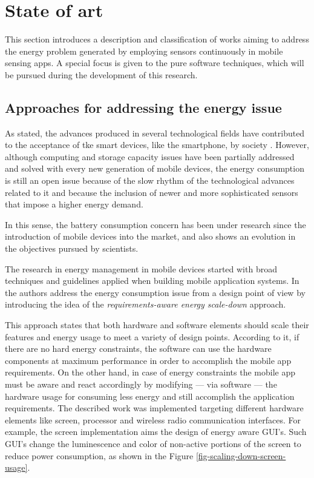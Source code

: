 \section{State of art} 
\label{sec:state_of_art}
This section introduces a description and classification of works aiming to address the energy problem generated by employing sensors continuously in mobile sensing apps.
A special focus is given to the pure software techniques, which will be pursued during the development of this research.

\subsection{Approaches for addressing the energy issue}

As stated, the advances produced in several technological fields have contributed to the acceptance of tke smart devices, like the smartphone, by society \cite{Lane2010,Ra2012}.
However, although computing and storage capacity issues have been partially addressed and solved with every new generation of mobile devices, the energy consumption is still an open issue because of the slow rhythm of the technological advances related to it and because the inclusion of newer and more sophisticated sensors that impose a higher energy demand.

In this sense, the battery consumption concern has been under research since the introduction of mobile devices into the market, and also shows an evolution in the objectives pursued by scientists. 

The research in energy management in mobile devices started with broad techniques and guidelines applied when building mobile application systems.
In \cite{Mayo2004} the authors address the energy consumption issue from a design point of view by introducing the idea of the \emph{requirements-aware energy scale-down} approach. 

This approach states that both hardware and software elements should scale their features and energy usage to meet a variety of design points.
According to it, if there are no hard energy constraints, the software can use the hardware components at maximum performance in order to accomplish the mobile app requirements.
On the other hand, in case of energy constraints the mobile app must be aware and react accordingly by modifying --- via software --- the hardware usage for consuming less energy and still accomplish the application requirements.
The described work was implemented targeting different hardware elements like screen, processor and wireless radio communication interfaces.
For example, the screen implementation aims the design of energy aware GUI's.
Such GUI's change the luminescence and color of non-active portions of the screen to reduce power consumption, as shown in the Figure \ref{fig-scaling-down-screen-usage}.

